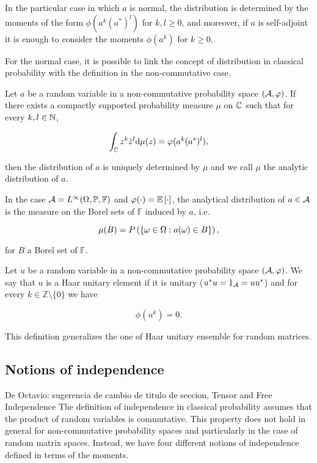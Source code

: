     In the particular case in which $a$ is normal, the distribution is determined by the moments of the form $\phi(a^k(a^*)^l)$ for $k,l \ge 0$, and moreover, if $a$ is self-adjoint it is enough to consider the moments $\phi(a^k)$ for $k\ge 0$. 
    
    For the normal case, it is possible to link the concept of distribution in classical probability with the definition in the non-commutative case.

    \begin{definition}
        Let $a$ be a random variable in a non-commutative probability space $(\A,\phi)$. If there exists a compactly supported probability measure $\mu$ on $\C$ such that for every $k,l\in \N$,

        \begin{equation*}
            \int_\C z^k \bar{z}^l \d \mu(z) = \phi(a^k(a^*)^l),
        \end{equation*}

        then the distribution of $a$ is uniquely determined by $\mu$ and we call $\mu$ the analytic distribution of $a$.
    \end{definition}

    In the case $\A = L^{\infty}(\Omega,\mathbb P, \mathbb F)$ and $\phi(\cdot) = \E{\cdot}$, the analytical distribution of $a \in \A$ is the measure on the Borel sets of $\mathbb F$ induced by $a$, i.e.

    \begin{equation*}
        \mu(B) = \P{ \{ \omega \in \Omega : a(\omega) \in B \} },
    \end{equation*}

    \noindent for $B$ a Borel set of $\mathbb F$.

    \begin{example}
        Let $u$ be a random variable in a non-commutative probability space $(\A,\phi)$. We say that $u$ is a Haar unitary element if it is unitary ($u^*u = 1_\A = uu^*$) and for every $k\in \mathbb Z \setminus \{0\}$ we have

        \begin{equation*}
            \phi(u^k) = 0.
        \end{equation*}
    \end{example}

    This definition generalizes the one of Haar unitary ensemble for random matrices.

\subsection{Notions of independence}
{\color{red} De Octavio: sugerencia de cambio de titulo de seccion, Tensor and Free Independence}
    The definition of independence in classical probability assumes that the product of random variables is commutative. This property does not hold in general for non-commutative probability spaces and particularly in the case of random matrix spaces. Instead, we have four different notions of independence defined in terms of the moments.


